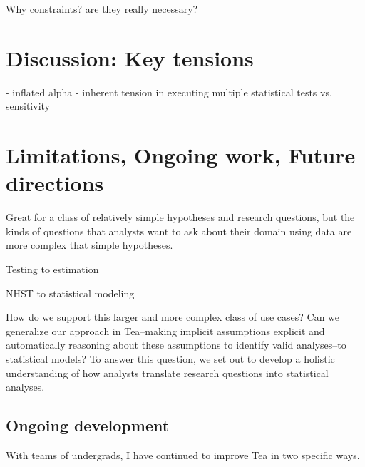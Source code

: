 



Why constraints? are they really necessary?



\section{Discussion: Key tensions}
- inflated alpha
- inherent tension in executing multiple statistical tests vs. sensitivity

\section{Limitations, Ongoing work, Future directions}

Great for a class of relatively simple hypotheses and research questions, but
the kinds of questions that analysts want to ask about their domain using data
are more complex that simple hypotheses. 

Testing to estimation 

NHST to statistical modeling

How do we support this larger and more complex class of use cases? Can we
generalize our approach in Tea--making implicit assumptions explicit and
automatically reasoning about these assumptions to identify valid analyses--to
statistical models? To answer this question, we set out to develop a holistic
understanding of how analysts translate research questions into statistical
analyses. 

\subsection{Ongoing development}
With teams of undergrads, I have continued to improve Tea in two specific ways. 

